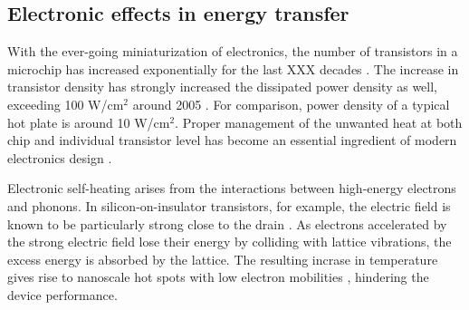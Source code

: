 \subsection{Electronic effects in energy transfer}
\label{sec:intro_electrons}

With the ever-going miniaturization of electronics, the number of transistors in a microchip has increased exponentially for the last XXX decades \cite{}. The increase in transistor density has strongly increased the dissipated power density as well, exceeding 100 W/cm$^2$ around 2005 \cite{pop10}. For comparison, power density of a typical hot plate is around 10 W/cm$^2$. Proper management of the unwanted heat at both chip and individual transistor level has become an essential ingredient of modern electronics design \cite{pop06_ieee}.

Electronic self-heating arises from the interactions between high-energy electrons and phonons. In silicon-on-insulator transistors, for example, the electric field is known to be particularly strong close to the drain \cite{pop06_ieee}. As electrons accelerated by the strong electric field lose their energy by colliding with lattice vibrations, the excess energy is absorbed by the lattice. The resulting incrase in temperature gives rise to nanoscale hot spots with low electron mobilities \cite{pop06_ieee}, hindering the device performance. %



